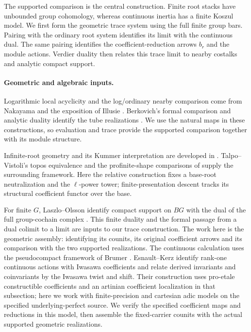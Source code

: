 \documentclass[11pt]{article}
\theoremstyle{definition}
\theoremstyle{remark}
\begin{document}
The supported comparison is the central construction.  Finite root
stacks have unbounded group cohomology, whereas continuous inertia
has a finite Koszul model.  We first form the geometric trace system
using the full finite group bars.  Pairing with the ordinary root
system identifies its limit with the continuous dual.  The same
pairing identifies the coefficient-reduction arrows $b_r$ and the
module actions.  Verdier duality then relates this trace limit to
nearby costalks and analytic compact support.

\paragraph{Geometric and algebraic inputs.}
Logarithmic local acyclicity and the log/ordinary nearby comparison
come from Nakayama and the exposition of Illusie
\cite{NakayamaNearby,FujiwaraKatoNakayama}.  Berkovich's formal
comparison and analytic duality identify the tube realizations
\cite{BerkovichFormalII,BerkovichEtale}.  We use the natural maps in
these constructions, so evaluation and trace provide the supported
comparison together with its module structure.

Infinite-root geometry and its Kummer interpretation are developed in
\cite{TalpoVistoliInfiniteRoot,TalpoVistoliKN,ScherotzkeSibillaTalpoMcKay}.
Talpo--Vistoli's topos equivalence
\cite[Theorem 6.22, arXiv v2 numbering]{TalpoVistoliInfiniteRoot}
and the profinite-shape comparisons of
\cite[\S\S5--6]{CarchediEtAlLogHomotopy} supply the surrounding framework.
Here the relative construction fixes a base-root neutralization and
the $\ell$-power tower; finite-presentation descent tracks its
structural coefficient functor over the base.

For finite $G$, Laszlo--Olsson identify compact support on $BG$
with the dual of the full group-cochain complex
\cite[Example 4.9.2]{LaszloOlssonFinite}.  This finite duality and
the formal passage from a dual colimit to a limit are inputs to
our trace construction.  The work here is the geometric assembly:
identifying its counits, its original coefficient arrows and its
comparison with the two supported realizations.  The continuous
calculation uses the pseudocompact framework of Brumer
\cite{BrumerPseudocompact}.  Esnault--Kerz
\cite[Appendix A.2]{EsnaultKerzPencils} identify rank-one continuous
actions with Iwasawa coefficients and relate derived invariants and
coinvariants by the Iwasawa twist and shift.  Their construction uses
pro-etale constructible coefficients and an artinian coefficient
localization in that subsection; here we work with finite-precision and cartesian adic models on the
specified underlying-perfect source.  We verify the specified coefficient
maps and reductions in this model, then assemble the fixed-carrier
counits with the actual supported geometric realizations.
\label{frag:literature-status}
\end{document}
